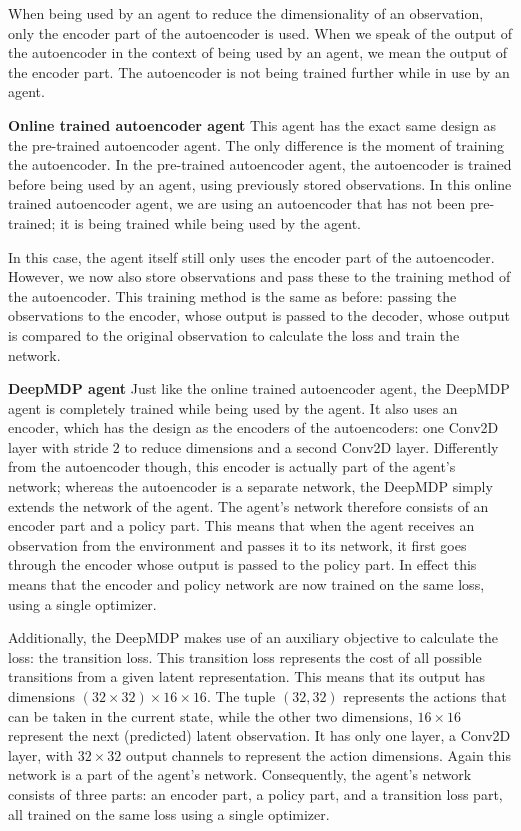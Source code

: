 When being used by an agent to reduce the dimensionality of an observation, only the encoder part of the autoencoder is used. When we speak of the output of the autoencoder in the context of being used by an agent, we mean the output of the encoder part. The autoencoder is not being trained further while in use by an agent. \newline
 
\noindent \textbf{Online trained autoencoder agent}\newline
\noindent  This agent has the exact same design as the pre-trained autoencoder agent. The only difference is the moment of training the autoencoder. In the pre-trained autoencoder agent, the autoencoder is trained before being used by an agent, using previously stored observations. In this online trained autoencoder agent, we are using an autoencoder that has not been pre-trained; it is being trained while being used by the agent. 

In this case, the agent itself still only uses the encoder part of the autoencoder. However, we now also store observations and pass these to the training method of the autoencoder. This training method is the same as before: passing the observations to the encoder, whose output is passed to the decoder, whose output is compared to the original observation to calculate the loss and train the network.\newline

\noindent \textbf{DeepMDP agent}\newline
\noindent Just like the online trained autoencoder agent, the DeepMDP agent is completely trained while being used by the agent. It also uses an encoder, which has the design as the encoders of the autoencoders: one Conv2D layer with stride $2$ to reduce dimensions and a second Conv2D layer. Differently from the autoencoder though, this encoder is actually part of the agent's network; whereas the autoencoder is a separate network, the DeepMDP simply extends the network of the agent. The agent's network therefore consists of an encoder part and a policy part. This means that when the agent receives an observation from the environment and passes it to its network, it first goes through the encoder whose output is passed to the policy part. In effect this means that the encoder and policy network are now trained on the same loss, using a single optimizer.

Additionally, the DeepMDP makes use of an auxiliary objective to calculate the loss: the transition loss. This transition loss represents the cost of all possible transitions from a given latent representation. This means that its output has dimensions $(32 \times 32) \times 16 \times 16$. The tuple $(32, 32)$ represents the actions that can be taken in the current state, while the other two dimensions, $16 \times 16$ represent the next (predicted) latent observation. It has only one layer, a Conv2D layer, with $32 \times 32$ output channels to represent the action dimensions. Again this network is a part of the agent's network. Consequently, the agent's network consists of three parts: an encoder part, a policy part, and a transition loss part, all trained on the same loss using a single optimizer.

